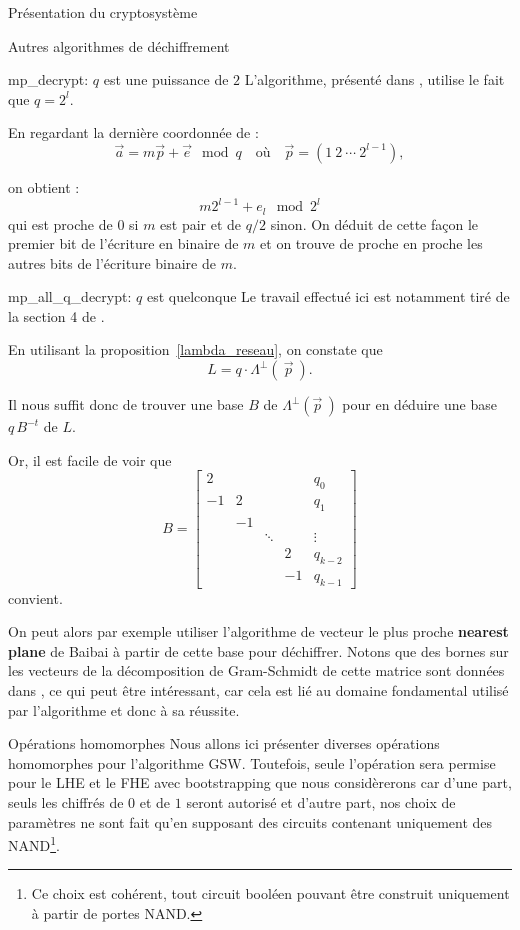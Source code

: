 \begin{section}{Présentation du cryptosystème}
\begin{subsection}{Autres algorithmes de déchiffrement}
\begin{subsubsection}{mp\_decrypt: $q$ est une puissance de $2$}
	L'algorithme, présenté dans \cite{EPRINT:GenSahWat13}, utilise le fait que $q = 2^l$.

	En regardant la dernière coordonnée de :
\[\vec{a} = m \vec{p} + \vec{e} \mod q\quad \text{où}\quad \vec{p} = (1\:2\:\cdots\:2^{l-1}), \]
 
	on obtient :
\[m 2^{l-1} + e_{l} \mod 2^l \]
	qui est proche de 0 si $m$ est pair et de $q/2$ sinon. On déduit de cette façon le premier bit de l'écriture en
	binaire de $m$ et on trouve de proche en proche les autres bits de l'écriture binaire de $m$.
	
\end{subsubsection}
\begin{subsubsection}{mp\_all\_q\_decrypt: $q$ est quelconque}
	Le travail effectué ici est notamment tiré de la section 4 de \cite{EC:MicPei12}.

	En utilisant la proposition~\ref{lambda_reseau}, on constate que
\[ L = q \cdot \Lambda^\bot\left(\:\vec{p}\:\right).\]

	Il nous suffit donc de trouver une base $B$ de $\Lambda^\bot\left(\vec{p}\:\right)$ pour en déduire une base $q \, B^{-t}$ de $L$.

	Or, il est facile de voir que
\[ B = \begin{bmatrix} 
	2 & &&& q_0\\  
	-1 & 2 &&& q_1\\
   & -1 \\ 
	&    & \ddots & & \vdots \\
	&    &       &  2 & q_{k-2} \\
	&    &       &  -1 & q_{k-1}
\end{bmatrix}\]
convient.

On peut alors par exemple utiliser l'algorithme de vecteur le plus proche \textbf{nearest plane} de Baibai à partir de
cette base pour déchiffrer. Notons que des bornes sur les vecteurs de la décomposition de Gram-Schmidt de cette matrice
sont données dans \cite{EC:MicPei12}, ce qui peut être intéressant, car cela est lié au domaine fondamental utilisé par
l'algorithme et donc à sa réussite.

\end{subsubsection}	
\end{subsection}

\begin{subsection}{Opérations homomorphes}
Nous allons ici présenter diverses opérations homomorphes pour l'algorithme GSW. Toutefois, seule l'opération
 sera permise pour le LHE et le FHE avec bootstrapping que nous considèrerons car d'une part, seuls les
chiffrés de $0$ et de $1$ seront autorisé et d'autre part, nos choix de paramètres ne sont fait qu'en supposant des
circuits contenant uniquement des NAND\footnote{Ce choix est cohérent, tout circuit booléen pouvant être construit
uniquement à partir de portes  NAND.}.



\end{subsection}
\end{section}
